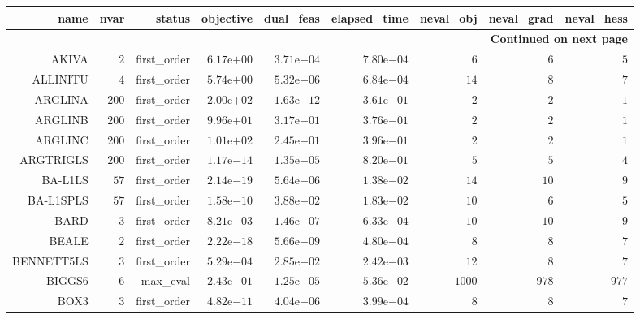 \begin{longtable}{rrrrrrrrr}
\hline
name & nvar & status & objective & dual\_feas & elapsed\_time & neval\_obj & neval\_grad & neval\_hess \\\hline
\endhead
\hline
\multicolumn{9}{r}{{\bfseries Continued on next page}}\\
\hline
\endfoot
\endlastfoot
AKIVA & \(     2\) & first\_order & \( 6.17\)e\(+00\) & \( 3.71\)e\(-04\) & \( 7.80\)e\(-04\) & \(     6\) & \(     6\) & \(     5\) \\
ALLINITU & \(     4\) & first\_order & \( 5.74\)e\(+00\) & \( 5.32\)e\(-06\) & \( 6.84\)e\(-04\) & \(    14\) & \(     8\) & \(     7\) \\
ARGLINA & \(   200\) & first\_order & \( 2.00\)e\(+02\) & \( 1.63\)e\(-12\) & \( 3.61\)e\(-01\) & \(     2\) & \(     2\) & \(     1\) \\
ARGLINB & \(   200\) & first\_order & \( 9.96\)e\(+01\) & \( 3.17\)e\(-01\) & \( 3.76\)e\(-01\) & \(     2\) & \(     2\) & \(     1\) \\
ARGLINC & \(   200\) & first\_order & \( 1.01\)e\(+02\) & \( 2.45\)e\(-01\) & \( 3.96\)e\(-01\) & \(     2\) & \(     2\) & \(     1\) \\
ARGTRIGLS & \(   200\) & first\_order & \( 1.17\)e\(-14\) & \( 1.35\)e\(-05\) & \( 8.20\)e\(-01\) & \(     5\) & \(     5\) & \(     4\) \\
BA-L1LS & \(    57\) & first\_order & \( 2.14\)e\(-19\) & \( 5.64\)e\(-06\) & \( 1.38\)e\(-02\) & \(    14\) & \(    10\) & \(     9\) \\
BA-L1SPLS & \(    57\) & first\_order & \( 1.58\)e\(-10\) & \( 3.88\)e\(-02\) & \( 1.83\)e\(-02\) & \(    10\) & \(     6\) & \(     5\) \\
BARD & \(     3\) & first\_order & \( 8.21\)e\(-03\) & \( 1.46\)e\(-07\) & \( 6.33\)e\(-04\) & \(    10\) & \(    10\) & \(     9\) \\
BEALE & \(     2\) & first\_order & \( 2.22\)e\(-18\) & \( 5.66\)e\(-09\) & \( 4.80\)e\(-04\) & \(     8\) & \(     8\) & \(     7\) \\
BENNETT5LS & \(     3\) & first\_order & \( 5.29\)e\(-04\) & \( 2.85\)e\(-02\) & \( 2.42\)e\(-03\) & \(    12\) & \(     8\) & \(     7\) \\
BIGGS6 & \(     6\) & max\_eval & \( 2.43\)e\(-01\) & \( 1.25\)e\(-05\) & \( 5.36\)e\(-02\) & \(  1000\) & \(   978\) & \(   977\) \\
BOX3 & \(     3\) & first\_order & \( 4.82\)e\(-11\) & \( 4.04\)e\(-06\) & \( 3.99\)e\(-04\) & \(     8\) & \(     8\) & \(     7\) \\

\end{longtable}
